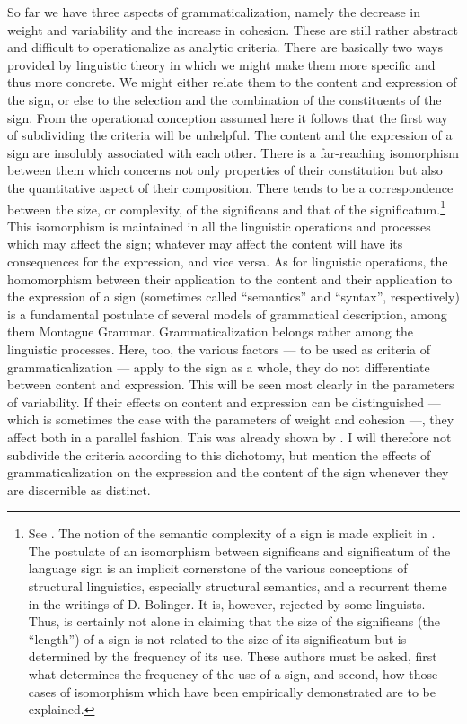 So far we have three aspects of grammaticalization, namely the decrease in weight and variability and the increase in cohesion. These are still rather abstract and difficult to operationalize as analytic criteria. There are basically two ways provided by linguistic theory in which we might make them more specific and thus more concrete. We might either relate them to the content and expression of the sign, or else to the selection and the combination of the constituents of the sign. From the operational conception assumed here it follows that the first way of subdividing the criteria will be unhelpful. The content and the expression of a sign are insolubly associated with each other. There is a far-reaching isomorphism between them which concerns not only properties of their constitution but also the quantitative aspect of their composition. There tends to be a correspondence between the size, or complexity, of the significans and that of the significatum.\footnote{See \citet{Lehmann1974}. The notion of the semantic complexity of a sign is made explicit in \citet{Lehmann1978}. The postulate of an isomorphism between significans and significatum of the language sign is an implicit cornerstone of the various conceptions of structural linguistics, especially structural semantics, and a recurrent theme in the writings of D. Bolinger. It is, however, rejected by some linguists. Thus, \citet[239]{Ronneberger-Sibold1980} is certainly not alone in claiming that the size of the significans (the “length”) of a sign is not related to the size of its significatum but is determined by the frequency of its use. These authors must be asked, first what determines the frequency of the use of a sign, and second, how those cases of isomorphism which have been empirically demonstrated are to be explained.} This isomorphism is maintained in all the linguistic operations and processes which may affect the sign; whatever may affect the content will have its consequences for the expression, and vice versa. As for linguistic operations, the homomorphism between their application to the content and their application to the expression of a sign (sometimes called “semantics” and “syntax”, respectively) is a fundamental postulate of several models of grammatical description, among them Montague Grammar. Grammaticalization belongs rather among the linguistic processes. Here, too, the various factors — to be used as criteria of grammaticalization — apply to the sign as a whole, they do not differentiate between content and expression. This will be seen most clearly in the parameters of variability. If their effects on content and expression can be distinguished — which is sometimes the case with the parameters of weight and cohesion —, they affect both in a parallel fashion. This was already shown by \citet[135--139]{Meillet1912}. I will therefore not subdivide the criteria according to this dichotomy, but mention the effects of grammaticalization on the expression and the content of the sign whenever they are discernible as distinct.

